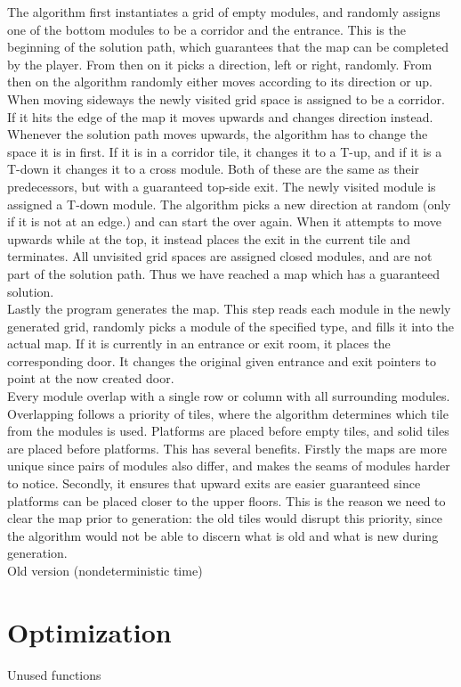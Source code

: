 The algorithm first instantiates a grid of empty modules, and randomly assigns one of the bottom modules to be a corridor and the entrance. This is the beginning of the solution path, which guarantees that the map can be completed by the player. From then on it picks a direction, left or right, randomly. From then on the algorithm randomly either moves according to its direction or up. When moving sideways the newly visited grid space is assigned to be a corridor. If it hits the edge of the map it moves upwards and changes direction instead. Whenever the solution path moves upwards, the algorithm has to change the space it is in first. If it is in a corridor tile, it changes it to a T-up, and if it is a T-down it changes it to a cross module. Both of these are the same as their predecessors, but with a guaranteed top-side exit. The newly visited module is assigned a T-down module. The algorithm picks a new direction at random (only if it is not at an edge.) and can start the over again. When it attempts to move upwards while at the top, it instead places the exit in the current tile and terminates. All unvisited grid spaces are assigned closed modules, and are not part of the solution path. Thus we have reached a map which has a guaranteed solution.\\
Lastly the program generates the map. This step reads each module in the newly generated grid, randomly picks a module of the specified type, and fills it into the actual map. If it is currently in an entrance or exit room, it places the corresponding door. It changes the original given entrance and exit pointers to point at the now created door.\\
Every module overlap with a single row or column with all surrounding modules. Overlapping follows a priority of tiles, where the algorithm determines which tile from the modules is used. Platforms are placed before empty tiles, and solid tiles are placed before platforms. This has several benefits. Firstly the maps are more unique since pairs of modules also differ, and makes the seams of modules harder to notice. Secondly, it ensures that upward exits are easier guaranteed since platforms can be placed closer to the upper floors. This is the reason we need to clear the map prior to generation: the old tiles would disrupt this priority, since the algorithm would not be able to discern what is old and what is new during generation.\\
Old version (nondeterministic time)
\section{Optimization}
Unused functions

